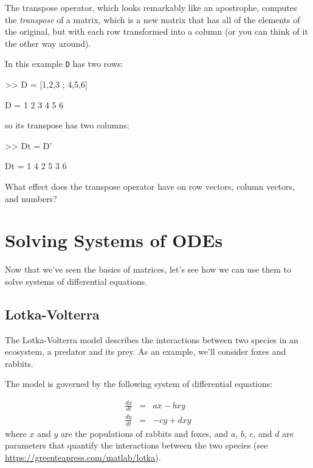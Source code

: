The transpose operator, which looks remarkably like an apostrophe,
computes the \emph{transpose} of a matrix, which is a new matrix
that has all of the elements of the original, but with each row
transformed into a column (or you can think of it the other way around).


In this example \lstinline{D} has two rows:

\begin{code}
>> D = [1,2,3 ; 4,5,6]

D =  1     2     3
     4     5     6
\end{code}
so its transpose has two columns:

\begin{code}
>> Dt = D'

Dt = 1     4
     2     5
     3     6
\end{code}

\begin{ex}
What effect does the transpose operator
have on row vectors, column vectors, and numbers?
\end{ex}


\section{Solving Systems of ODEs}

Now that we've seen the basics of matrices, let's see how we can use them to solve systems of differential equations.

\subsection{Lotka-Volterra}
\label{lotka}

The Lotka-Volterra model describes the interactions between two
species in an ecosystem, a predator and its prey.  As an example, we'll consider foxes and rabbits.


The model is governed by the following system of differential equations:

\begin{eqnarray*}
    \frac{dx}{dt} &=& a x - b x y         \\
    \frac{dy}{dt} &=& -c y + d x y
\end{eqnarray*}
%
where $x$ and $y$ are the populations of rabbits and foxes,
and $a$, $b$, $c$, and $d$ are parameters
that quantify the interactions between the two species (see
\url{https://greenteapress.com/matlab/lotka}).


